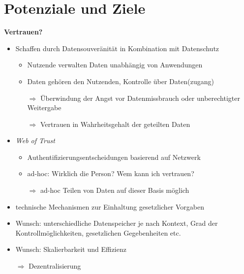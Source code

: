 
\section{Potenziale und Ziele}

\textbf{Vertrauen?}
\begin{itemize}
    \item Schaffen durch Datensouveränität in Kombination mit Datenschutz
    \begin{itemize}
        \item Nutzende verwalten Daten unabhängig von Anwendungen
        \item Daten gehören den Nutzenden, Kontrolle über Daten(zugang)
        \item[$\Rightarrow$] Überwindung der Angst vor Datenmissbrauch oder unberechtigter Weitergabe
        \item[$\Rightarrow$] Vertrauen in Wahrheitsgehalt der geteilten Daten
    \end{itemize}

    \item \emph{Web of Trust}
    \begin{itemize}
        \item Authentifizierungsentscheidungen basierend auf Netzwerk
        \item ad-hoc: Wirklich die Person? Wem kann ich vertrauen?
        \item[$\Rightarrow$] ad-hoc Teilen von Daten auf dieser Basis möglich
    \end{itemize}
    
    \item technische Mechanismen zur Einhaltung gesetzlicher Vorgaben
    \item Wunsch: unterschiedliche Datenspeicher je nach Kontext, Grad der Kontrollmöglichkeiten, gesetzlichen Gegebenheiten etc.
    \item Wunsch: Skalierbarkeit und Effizienz
    \item[$\Rightarrow$] Dezentralisierung
    
    \vspace{1em}
\end{itemize}

\vspace{1em}

